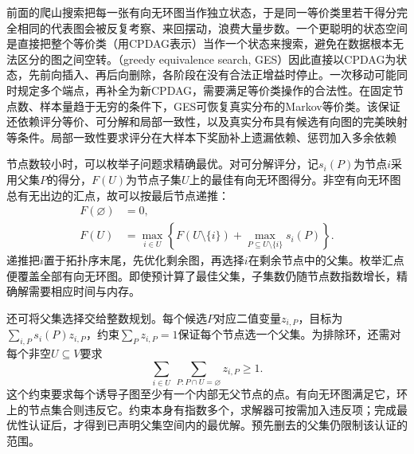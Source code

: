 前面的爬山搜索把每一张有向无环图当作独立状态，于是同一等价类里若干得分完全相同的代表图会被反复考察、来回摆动，浪费大量步数。一个更聪明的状态空间是直接把整个等价类（用CPDAG表示）当作一个状态来搜索，避免在数据根本无法区分的图之间空转。（greedy equivalence search, GES）因此直接以CPDAG为状态，先前向插入、再后向删除，各阶段在没有合法正增益时停止。一次移动可能同时规定多个端点，再补全为新CPDAG，需要满足等价类操作的合法性。在固定节点数、样本量趋于无穷的条件下，GES可恢复真实分布的Markov等价类。该保证还依赖评分等价、可分解和局部一致性，以及真实分布具有候选有向图的完美映射等条件。局部一致性要求评分在大样本下奖励补上遗漏依赖、惩罚加入多余依赖

节点数较小时，可以枚举子问题求精确最优。对可分解评分，记$s_i(P)$为节点$i$采用父集$P$的得分，$F(U)$为节点子集$U$上的最佳有向无环图得分。非空有向无环图总有无出边的汇点，故可以按最后节点递推：
\begin{equation}
  \begin{aligned}
    F(\varnothing)&=0,\\
    F(U)&=\max_{i\in U}\left\{
      F(U\setminus\{i\})
      +\max_{P\subseteq U\setminus\{i\}}s_i(P)\right\}.
  \end{aligned}
  \label{eq:pgm-structure-learning-dp}
\end{equation}
递推把$i$置于拓扑序末尾，先优化剩余图，再选择$i$在剩余节点中的父集。枚举汇点便覆盖全部有向无环图。即使预计算了最佳父集，子集数仍随节点数指数增长，精确解需要相应时间与内存。

还可将父集选择交给整数规划。每个候选$P$对应二值变量$z_{i,P}$，目标为$\sum_{i,P}s_i(P)z_{i,P}$，约束$\sum_Pz_{i,P}=1$保证每个节点选一个父集。为排除环，还需对每个非空$U\subseteq V$要求
\[
  \sum_{i\in U}\ \sum_{P:P\cap U=\varnothing}z_{i,P}\geq1.
\]
这个约束要求每个诱导子图至少有一个内部无父节点的点。有向无环图满足它，环上的节点集合则违反它。约束本身有指数多个，求解器可按需加入违反项；完成最优性认证后，才得到已声明父集空间内的最优解。预先删去的父集仍限制该认证的范围。

